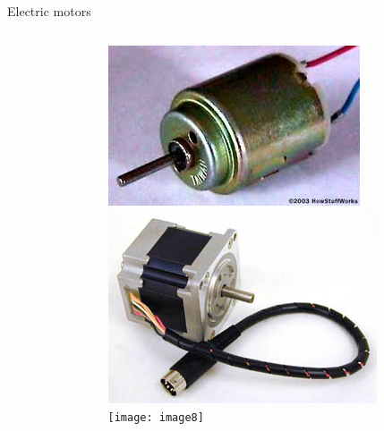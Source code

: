 \documentclass[compress]{beamer}
\begin{document}
\begin{frame}{Electric motors}
\begin{columns}
\begin{column}{0.7\linewidth}
        \end{column}
        \begin{column}{0.3\linewidth}
            \begin{center}
                \includegraphics[width=\linewidth]{image6}\\
                \includegraphics[width=\linewidth]{image7}\\
                \texttt{[image: image8]}
            \end{center}
        \end{column}
    \end{columns}

\end{frame}
\end{document}
